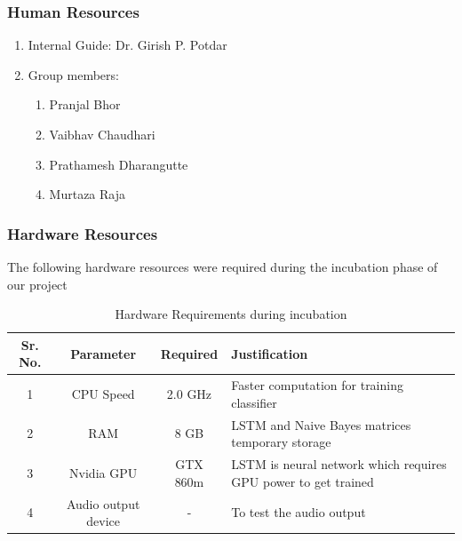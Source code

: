 \documentclass[oneside,a4paper,12pt]{book}
\begin{document}
	\subsubsection{Human Resources}
		\begin{enumerate}
			\item Internal Guide: Dr. Girish P. Potdar
			\item Group members:
				\begin{enumerate}[i]
					\item Pranjal Bhor
					\item Vaibhav Chaudhari
					\item Prathamesh Dharangutte
					\item Murtaza Raja
				\end{enumerate}
		\end{enumerate}
	
	\subsubsection{Hardware Resources}
		The following hardware resources were required during the incubation phase of our project
		\begin{table}[!htbp]
			\begin{center}
				\def\arraystretch{1.5}
				\begin{tabularx}{\textwidth}{| c | c | c | X |}
					\hline
					Sr. No. &	Parameter &	Required & Justification \\
					\hline
					1 &	CPU Speed &	 2.0 GHz  & Faster computation for training classifier\\
					\hline
					2 &	RAM  &	8 GB &  LSTM and Naive Bayes matrices temporary storage\\
					\hline
					3 & Nvidia GPU & GTX 860m & LSTM is neural network which requires GPU power to get trained\\
					\hline
					4 & Audio output device & - & To test the audio output\\
					\hline
				\end{tabularx}
				\caption { Hardware Requirements during incubation}
				\label{tab:incubhreq}
			\end{center}
			
		\end{table}
	\newpage
\end{document}
